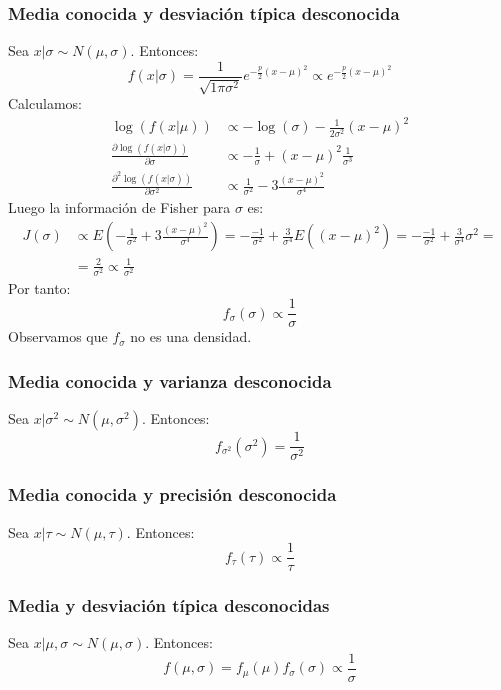 \subsubsection*{Media conocida y desviación típica desconocida}
Sea $x|\sigma \sim N(\mu, \sigma)$.
Entonces:
$$f(x|\sigma) = \frac{1}{\sqrt{1\pi\sigma^2}}e^{-\frac{p}{2}(x-\mu)^2} \propto e^{-\frac{p}{2}(x-\mu)^2}$$
Calculamos:
\begin{align*}
    \log(f(x|\mu))                                         & \propto -\log(\sigma) - \frac{1}{2\sigma^2}(x-\mu)^2     \\
    \frac{\partial \log(f(x|\sigma))}{\partial \sigma}     & \propto -\frac{1}{\sigma} + (x-\mu)^2\frac{1}{\sigma^3}  \\
    \frac{\partial^2 \log(f(x|\sigma))}{\partial \sigma^2} & \propto \frac{1}{\sigma^2} - 3\frac{(x-\mu)^2}{\sigma^4}
\end{align*}
Luego la información de Fisher para $\sigma$ es:
\begin{align*}
    J(\sigma) & \propto E\left(-\frac{1}{\sigma^2} + 3\frac{(x-\mu)^2}{\sigma^4}\right) = -\frac{-1}{\sigma^2} + \frac{3}{\sigma^4}E((x-\mu)^2) = -\frac{-1}{\sigma^2} + \frac{3}{\sigma^4}\sigma^2 = \\
              & = \frac{2}{\sigma^2} \propto \frac{1}{\sigma^2}
\end{align*}
Por tanto:
$$f_\sigma(\sigma) \propto \frac{1}{\sigma}$$
Observamos que $f_\sigma$ no es una densidad.

\subsubsection*{Media conocida y varianza desconocida}
Sea $x|\sigma^2 \sim N(\mu, \sigma^2)$.
Entonces:
$$f_{\sigma^2}(\sigma^2) = \frac{1}{\sigma^2}$$

\subsubsection*{Media conocida y precisión desconocida}
Sea $x|\tau \sim N(\mu, \tau)$.
Entonces:
$$f_\tau(\tau) \propto \frac{1}{\tau}$$

\subsubsection*{Media y desviación típica desconocidas}
Sea $x|\mu, \sigma \sim N(\mu, \sigma)$.
Entonces:
$$f(\mu, \sigma) = f_\mu(\mu)f_\sigma(\sigma) \propto \frac{1}{\sigma}$$

